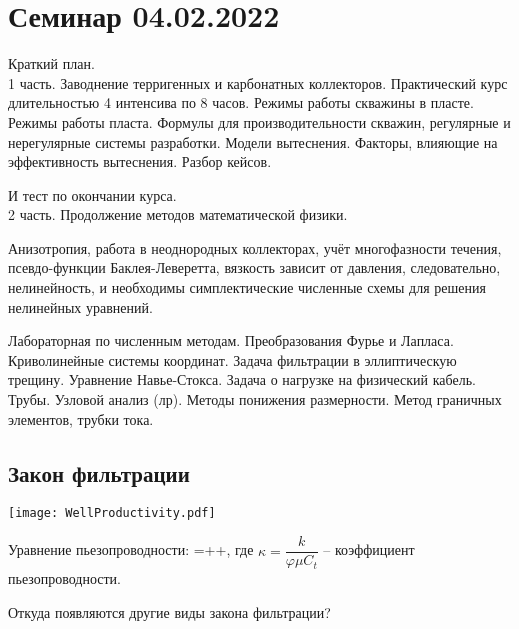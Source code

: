 \documentclass[main.tex]{subfiles}
\begin{document}
\section{Семинар 04.02.2022}

Краткий план.\\

1 часть. Заводнение терригенных и карбонатных коллекторов. Практический курс длительностью 4 интенсива по 8 часов. Режимы работы скважины в пласте. Режимы работы пласта. Формулы для производительности скважин, регулярные и нерегулярные системы разработки. Модели вытеснения. Факторы, влияющие на эффективность вытеснения. Разбор кейсов.

И тест по окончании курса.\\

2 часть. Продолжение методов математической физики.

Анизотропия, работа в неоднородных коллекторах, учёт многофазности течения, псевдо-функции Баклея-Леверетта, вязкость зависит от давления, следовательно, нелинейность, и необходимы симплектические численные схемы для решения нелинейных уравнений.

Лабораторная по численным методам. Преобразования Фурье и Лапласа. Криволинейные системы координат. Задача фильтрации в эллиптическую трещину. Уравнение Навье-Стокса. Задача о нагрузке на физический кабель. Трубы. Узловой анализ (лр). Методы понижения размерности. Метод граничных элементов, трубки тока.



\subsection{Закон фильтрации}
\texttt{[image: WellProductivity.pdf]}

Уравнение пьезопроводности:
\beq
{}=++,
\eeq
где $\kappa=\dfrac{k}{\varphi\mu C_t}$ -- коэффициент пьезопроводности.


Откуда появляются другие виды закона фильтрации?\\
\end{document}
